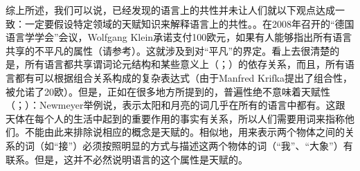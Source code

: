 综上所述，我们可以说，已经发现的语言上的共性并未让人们就以下观点达成一致：一定要假设特定领域的天赋知识来解释语言上的共性。。在2008年召开的“德国语言学学会”会议，Wolfgang Klein承诺支付100欧元，如果有人能够指出所有语言共享的不平凡的属性（请参考\citealp{Klein2009a}）。这就涉及到对“平凡”的界定。看上去很清楚的是，所有语言都共享谓词论元结构和某些意义上（\citealp[]{Hudson2010a}；\citealp[]{LR2010a}）的依存关系，而且，所有语言都有可以根据组合关系构成的复杂表达式（由于Manfred Krifka提出了组合性，被允诺了20欧）。但是，正如在很多地方所提到的，普遍性绝不意味着天赋性（\citealp[]{Bates84a}；\citealp[]{Newmeyer2005a}）：Newmeyer举例说，表示太阳和月亮的词几乎在所有的语言中都有。这跟天体在每个人的生活中起到的重要作用的事实有关系，所以人们需要用词来指称他们。不能由此来排除说相应的概念是天赋的。相似地，用来表示两个物体之间的关系的词（如“接”）必须按照明显的方式与描述这两个物体的词（“我”、“大象”）有联系。但是，这并不必然说明语言的这个属性是天赋的。

